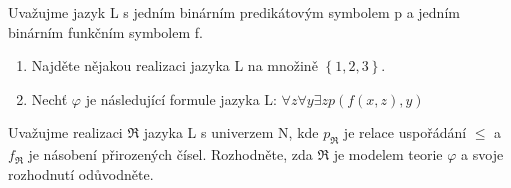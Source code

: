 Uvažujme jazyk L s jedním binárním predikátovým symbolem p a jedním binárním
funkčním symbolem f.

\begin{enumerate}
  \item Najděte nějakou realizaci jazyka L na množině $\left \{ 1,2,3 \right
  \}$.
  \item Nechť $\varphi$ je následující formule jazyka L: $\forall z \forall y
  \exists z p(f(x,z),y)$
\end{enumerate}

Uvažujme realizaci $\Re$ jazyka L s univerzem N, kde $p_{\Re}$ je relace
uspořádání $\leq$ a $f_{\Re}$ je násobení přirozených čísel. Rozhodněte, zda
$\Re$ je modelem teorie $\varphi$ a svoje rozhodnutí odůvodněte.
